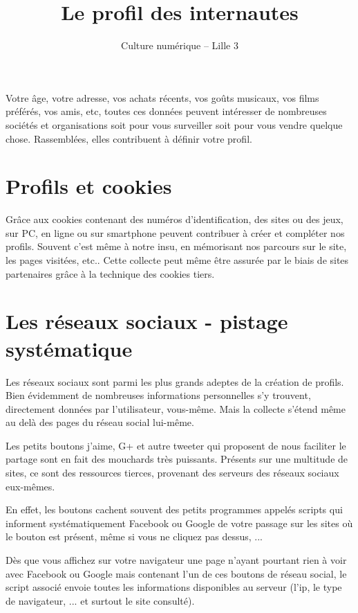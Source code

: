 \documentclass[12pt]{article}
\title{Le profil des internautes}
\author {Culture numérique -- Lille 3}
\date{}
\begin{document}
\maketitle

Votre âge, votre adresse,   vos achats
récents, vos goûts musicaux, vos films préférés, vos amis, etc,
toutes ces données peuvent intéresser de nombreuses sociétés et
organisations soit pour vous surveiller soit pour vous vendre quelque
chose. Rassemblées, elles contribuent à définir votre \og
profil\fg{}. 

\section*{Profils et cookies}


Grâce aux cookies contenant des numéros d'identification, des sites ou
des jeux, sur PC, en ligne ou sur smartphone peuvent contribuer à
créer et compléter nos profils. Souvent c'est même à notre insu, en
mémorisant nos parcours sur le site, les pages visitées, etc.. Cette
collecte peut même être assurée par le biais de sites partenaires grâce à la
technique des cookies tiers.


\section*{Les réseaux sociaux - pistage systématique}

Les réseaux sociaux sont parmi les plus grands adeptes de la création
de profils. Bien évidemment de nombreuses informations personnelles
s'y trouvent, directement données par l'utilisateur, vous-même. Mais la collecte
s'étend même au delà des pages du  réseau social lui-même.

Les petits boutons \og j'aime\fg{}, \og G+\fg{} et autre \og tweeter\fg{} qui proposent de
nous faciliter le partage sont en fait des mouchards très
puissants. Présents sur une multitude de sites, ce sont des ressources
tierces, provenant des serveurs des réseaux sociaux eux-mêmes.

En effet, les boutons cachent souvent des petits programmes appelés
scripts qui informent systématiquement Facebook ou Google de votre
passage sur les sites où le bouton est présent, même si vous ne
cliquez pas dessus, ...

Dès que vous affichez sur votre navigateur une page n'ayant pourtant
rien à voir avec Facebook ou Google mais contenant l'un de ces boutons
de réseau social, le script associé envoie toutes les informations
disponibles au serveur (l'ip, le type de navigateur, ...  et surtout
le site consulté).
\end{document}
